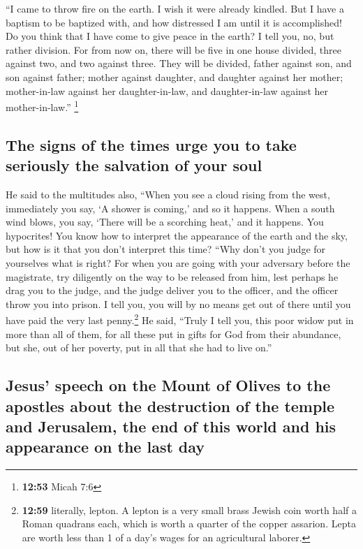  ``I came to throw fire on the earth. I wish it were
already kindled.  But I have a baptism to be baptized
with, and how distressed I am until it is accomplished! 
Do you think that I have come to give peace in the earth? I tell you,
no, but rather division.  For from now on, there will be
five in one house divided, three against two, and two against three.
 They will be divided, father against son, and son
against father; mother against daughter, and daughter against her
mother; mother-in-law against her daughter-in-law, and daughter-in-law
against her mother-in-law.'' \footnote{\textbf{12:53} Micah 7:6}

\hypertarget{the-signs-of-the-times-urge-you-to-take-seriously-the-salvation-of-your-soul}{%
\subsection{The signs of the times urge you to take seriously the
salvation of your
soul}\label{the-signs-of-the-times-urge-you-to-take-seriously-the-salvation-of-your-soul}}

 He said to the multitudes also, ``When you see a cloud
rising from the west, immediately you say, `A shower is coming,' and so
it happens.  When a south wind blows, you say, `There
will be a scorching heat,' and it happens.  You
hypocrites! You know how to interpret the appearance of the earth and
the sky, but how is it that you don't interpret this time?
 ``Why don't you judge for yourselves what is right?
 For when you are going with your adversary before the
magistrate, try diligently on the way to be released from him, lest
perhaps he drag you to the judge, and the judge deliver you to the
officer, and the officer throw you into prison.  I tell
you, you will by no means get out of there until you have paid the very
last penny.\footnote{\textbf{12:59} literally, lepton. A lepton is a
  very small brass Jewish coin worth half a Roman quadrans each, which
  is worth a quarter of the copper assarion. Lepta are worth less than 1
  of a day's wages for an agricultural laborer.}  He said,
``Truly I tell you, this poor widow put in more than all of them,
 for all these put in gifts for God from their abundance,
but she, out of her poverty, put in all that she had to live on.''

\hypertarget{jesus-speech-on-the-mount-of-olives-to-the-apostles-about-the-destruction-of-the-temple-and-jerusalem-the-end-of-this-world-and-his-appearance-on-the-last-day}{%
\subsection{Jesus' speech on the Mount of Olives to the apostles about
the destruction of the temple and Jerusalem, the end of this world and
his appearance on the last
day}\label{jesus-speech-on-the-mount-of-olives-to-the-apostles-about-the-destruction-of-the-temple-and-jerusalem-the-end-of-this-world-and-his-appearance-on-the-last-day}}

